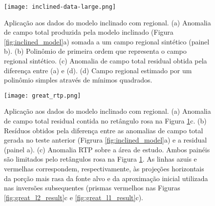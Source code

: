 \begin{figure}[!htb]
	\texttt{[image: inclined-data-large.png]}
	\caption{Aplicação aos dados do modelo inclinado com regional. 
		(a) Anomalia de campo total produzida pela modelo inclinado (Figura \ref{fig:inclined_model}a) somada a um campo regional sintético (painel b).
		(b) Polinômio de primeira ordem que representa o campo regional sintético.
		(c) Anomalia de campo total residual obtida pela diferença entre (a) e (d). (d) Campo regional estimado por um polinômio simples através de mínimos quadrados.
	}
	\label{fig:great_data}
\end{figure}
\pagebreak

\pagebreak

\begin{figure}[!htb]
	\centering
	\texttt{[image: great\_rtp.png]}
	\caption{Aplicação aos dados do modelo inclinado com regional. 
		(a) Anomalia de campo total residual contida no retângulo rosa na Figura \ref{fig:great_data}c. (b) Resíduos obtidos pela diferença entre as anomalias de campo total gerada no teste anterior (Figrura \ref{fig:inclined_model}a) e a residual (painel a). (c) Anomalia RTP sobre a área de estudo. Ambos painéis são limitados pelo retângulos rosa na Figura \ref{fig:great_data}. As linhas azuis e vermelhas correspondem, respectivamente, às projeções horizontais da porção mais rasa da fonte alvo e da aproximação inicial utilizada nas inversões subsequentes (prismas vermelhos nas Figuras \ref{fig:great_l2_result}c e 
		\ref{fig:great_l1_result}c).
	}
	\label{fig:great_model_rtp}
\end{figure}

\pagebreak

